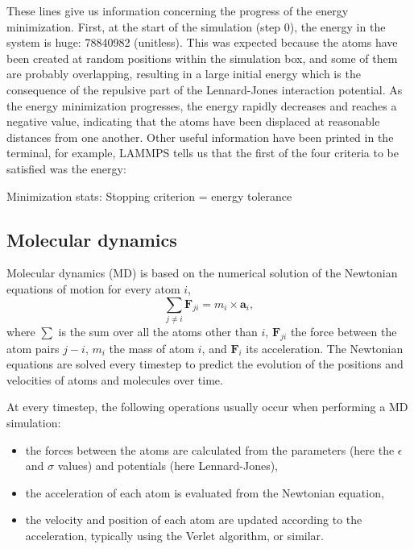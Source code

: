 \noindent These lines give us information concerning
the progress of the energy minimization. First, at the start
of the simulation (step 0), the energy in the system is
huge: 78840982 (unitless). This was expected because
the atoms have been created at random positions within the
simulation box, and some of them are probably overlapping,
resulting in a large initial energy which is the consequence
of the repulsive part of the Lennard-Jones interaction
potential. As the energy minimization progresses, the energy
rapidly decreases and reaches a negative value, indicating that the atoms have been
displaced at reasonable distances from one another. Other
useful information have been printed in the terminal, for
example, LAMMPS tells us that the first of the four criteria
to be satisfied was the energy:

\begin{lcverbatim}
Minimization stats:
Stopping criterion = energy tolerance
\end{lcverbatim}

\noindent \subsection{Molecular dynamics}

\begin{tcolorbox}[colback=mylightblue!5!white,colframe=mylightblue!75!black,title=Background Information -- What is molecular dynamics?]
Molecular dynamics (MD) is based on the numerical solution of the Newtonian
equations of motion for every atom $i$,
$$\sum_{j \ne i} \boldsymbol{F}_{ji} = m_i \times \boldsymbol{a}_i,$$
where $\sum$ is the sum over all the atoms other than $i$, 
$\boldsymbol{F}_{ji}$ the force between the atom pairs $j-i$,
$m_i$ the mass of atom $i$, and $\boldsymbol{F}_i$ its acceleration. 
The Newtonian equations are solved every timestep to predict the
evolution of the positions and velocities of atoms and molecules over time. 

At every timestep, the following operations usually occur when 
performing a MD simulation:
\begin{itemize}
\item the forces between the atoms are calculated from the parameters (here the $\epsilon$ and $\sigma$ values) and potentials (here Lennard-Jones),
\item the acceleration of each atom is evaluated from the Newtonian equation,
\item the velocity and position of each atom are updated according to the acceleration, typically using the Verlet algorithm, or similar.
\end{itemize}
\end{tcolorbox}

